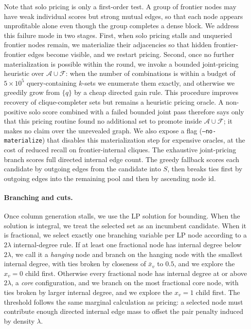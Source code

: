 \documentclass[12pt]{article}
\newcommand{\A}{\mathcal{A}}
\newcommand{\F}{\mathcal{F}}
\begin{document}
Note that solo pricing is only a first-order test.  A group of frontier nodes may have weak individual scores but strong mutual edges, so that each node appears unprofitable alone even though the group completes a dense block.  We address this failure mode in two stages.  First, when solo pricing stalls and unqueried frontier nodes remain, we materialize their adjacencies so that hidden frontier-frontier edges become visible, and we restart pricing.  Second, once no further materialization is possible within the round, we invoke a bounded joint-pricing heuristic over $\A\cup\F$: when the number of combinations is within a budget of $5\times10^5$ query-containing $k$-sets we enumerate them exactly, and otherwise we greedily grow from $\{q\}$ by a cheap directed gain rule.  This procedure improves recovery of clique-completer sets but remains a heuristic pricing oracle.  A non-positive solo score combined with a failed bounded joint pass therefore says only that this pricing routine found no additional set to promote inside $\A\cup\F$; it makes no claim over the unrevealed graph.  We also expose a flag (\texttt{--no-materialize}) that disables this materialization step for expensive oracles, at the cost of reduced recall on frontier-internal cliques.  The exhaustive joint-pricing branch scores full directed internal edge count.  The greedy fallback scores each candidate by outgoing edges from the candidate into $S$, then breaks ties first by outgoing edges into the remaining pool and then by ascending node id.

\paragraph{Branching and cuts.}
Once column generation stalls, we use the LP solution for bounding.  When the solution is integral, we treat the selected set as an incumbent candidate.  When it is fractional, we select exactly one branching variable per LP node according to a $2\lambda$ internal-degree rule.  If at least one fractional node has internal degree below $2\lambda$, we call it a \emph{hanging} node and branch on the hanging node with the smallest internal degree, with ties broken by closeness of $\bar{x}_v$ to $0.5$, and we explore the $x_v=0$ child first.  Otherwise every fractional node has internal degree at or above $2\lambda$, a \emph{core} configuration, and we branch on the most fractional core node, with ties broken by larger internal degree, and we explore the $x_v=1$ child first.  The threshold follows the same marginal calculation as pricing: a selected node must contribute enough directed internal edge mass to offset the pair penalty induced by density $\lambda$.
\end{document}

